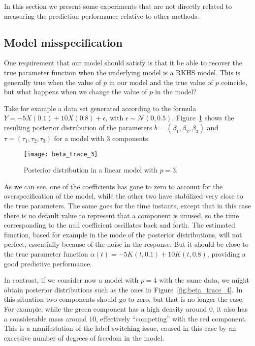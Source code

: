 In this section we present some experiments that are not directly related to measuring the prediction performance relative to other methods.

\subsection*{Model misspecification}

One requirement that our model should satisfy is that it be able to recover the true parameter function when the underlying model is a RKHS model. This is generally true when the value of \(p\) in our model and the true value of \(p\) coincide, but what happens when we change the value of \(p\) in the model?

Take for example a data set generated according to the formula \(Y=-5X(0.1) + 10X(0.8) + \epsilon\), with \(\epsilon\sim \mathcal N(0, 0.5)\). Figure~\ref{fig:beta_trace_3} shows the resulting posterior distribution of the parameters \(b=(\beta_1, \beta_2, \beta_3)\) and \(\tau=(\tau_1, \tau_2, \tau_3)\) for a model with 3 components.

\begin{figure}[ht!]
  \centering
  \texttt{[image: beta\_trace\_3]}
  \caption{Posterior distribution in a linear model with \(p=3\).}\label{fig:beta_trace_3}
\end{figure}

As we can see, one of the coefficients has gone to zero to account for the overspecification of the model, while the other two have stabilized very close to the true parameters. The same goes for the time instants, except that in this case there is no default value to represent that a component is unused, so the time corresponding to the null coefficient oscillates back and forth. The estimated function, based for example in the mode of the posterior distributions, will not perfect, essentially because of the noise in the response. But it should be close to the true parameter function \(\alpha(t)=-5K(t, 0.1) + 10K(t, 0.8)\), providing a good predictive performance.

In contrast, if we consider now a model with \(p=4\) with the same data, we might obtain posterior distributions such as the ones in Figure~\ref{fig:beta_trace_4}. In this situation two components should go to zero, but that is no longer the case. For example, while the green component has a high density around 0, it also has a considerable mass around 10, effectively ``competing'' with the red component. This is a manifestation of the label switching issue, caused in this case by an excessive number of degrees of freedom in the model.

